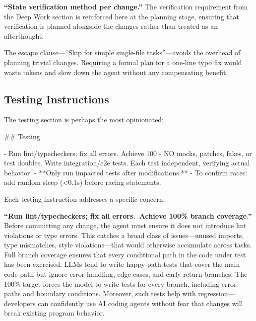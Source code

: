 \documentclass{article}
\begin{document}
\textbf{``State verification method per change.''}  The verification requirement from the Deep Work section is reinforced here at the planning stage, ensuring that verification is planned alongside the changes rather than treated as an afterthought.

\noindent The escape clause---``Skip for simple single-file tasks''---avoids the overhead of planning trivial changes.  Requiring a formal plan for a one-line typo fix would waste tokens and slow down the agent without any compensating benefit.

\subsection{Testing Instructions}

The testing section is perhaps the most opinionated:

\begin{prompt}
## Testing

- Run lint/typecheckers; fix all errors. Achieve 100%
- NO mocks, patches, fakes, or test doubles. Write integration/e2e tests. Each test independent, verifying actual behavior.
- **Only run impacted tests after modifications.**
- To confirm races: add random sleep (<0.1s) before racing statements.
\end{prompt}

\noindent Each testing instruction addresses a specific concern:

\textbf{``Run lint/typecheckers; fix all errors.\ Achieve 100\% branch coverage.''}  Before committing any change, the agent must ensure it does not introduce lint violations or type errors.  This catches a broad class of issues---unused imports, type mismatches, style violations---that would otherwise accumulate across tasks.  Full branch coverage ensures that every conditional path in the code under test has been exercised.  LLMs tend to write happy-path tests that cover the main code path but ignore error handling, edge cases, and early-return branches.  The 100\% target forces the model to write tests for every branch, including error paths and boundary conditions.  Moreover, such tests help with regression---developers can confidently use AI coding agents without fear that changes will break existing program behavior.
\end{document}
